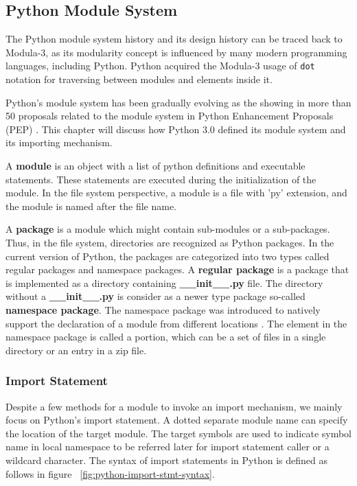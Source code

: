 
\subsection{Python Module System}

The Python module system history and its design history can be traced back to Modula-3, as its modularity concept is influenced by many modern programming languages, including Python.
Python acquired the Modula-3\cite{modula-3} usage of \texttt{dot} notation for traversing between modules and elements inside it\cite{python-foreward-essay}.

Python's module system has been gradually evolving as the showing in more than 50 proposals related to the module system in Python Enhancement Proposals (PEP) \cite{pep0}. This chapter will discuss how Python 3.0 defined its module system and its importing mechanism.

A \textbf{module} is an object with a list of python definitions and executable statements. These statements are executed during the initialization of the module. In the file system perspective, a module is a file with 'py' extension, and the module is named after the file name.

A \textbf{package} is a module which might contain sub-modules or a sub-packages.
Thus, in the file system, directories are recognized as Python packages.
In the current version of Python, the packages are categorized into two types called regular packages and namespace packages.
A \textbf{regular package} is a package that is implemented as a directory containing \textbf{\_\_init\_\_.py} file.
The directory without a \textbf{\_\_init\_\_.py} is consider as a newer type package so-called \textbf{namespace package}.
The namespace package was introduced to natively support the declaration of a module from different locations \cite{pep420}. The element in the namespace package is called a portion, which can be a set of files in a single directory or an entry in a zip file.

\subsubsection{Import Statement}

Despite a few methods for a module to invoke an import mechanism, we mainly focus on Python's import statement.
A dotted separate module name can specify the location of the target module. The target symbols are used to indicate symbol name in local namespace to be referred later for import statement caller or a wildcard character.
The syntax of import statements in Python is defined as follows in figure ~\ref{fig:python-import-stmt-syntax}.

